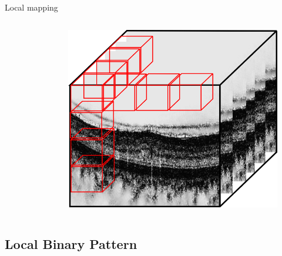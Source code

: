 \documentclass{beamer}
\begin{document}
\begin{frame}
\begin{block}{Local mapping}
\begin{columns}
\begin{column}{.5\linewidth}
\begin{figure}
        \end{figure}
      \end{column}
      \begin{column}{.5\linewidth}
        \begin{figure}
          \centering
          \includegraphics[width=.4\textwidth]{./images/local-3d.png}
        \end{figure}
      \end{column}
    \end{columns}
  \end{block}
\end{frame}

\subsection{Local Binary Pattern}
\end{document}

